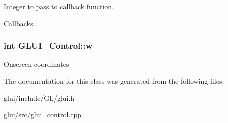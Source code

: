Integer to pass to callback function. 

Callbacks \hypertarget{classGLUI__Control_aca82a099b9cbbadb188794cbfb06aa27}{
\subsubsection[{w}]{\setlength{\rightskip}{0pt plus 5cm}int G\-L\-U\-I\-\_\-\-Control\-::w}}\label{classGLUI__Control_aca82a099b9cbbadb188794cbfb06aa27}
Onscreen coordinates 

The documentation for this class was generated from the following files\-:\begin{DoxyCompactItemize}
\item 
glui/include/\-G\-L/glui.\-h\item 
glui/src/glui\-\_\-control.\-cpp\end{DoxyCompactItemize}

